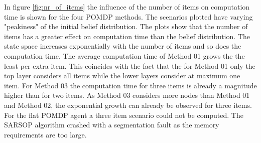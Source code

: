 In figure \ref{fig:nr_of_items} the influence of the number of items on computation time is shown for the four POMDP methods. The scenarios plotted have varying "peakiness" of the initial belief distribution. The plots show that the number of items has a greater effect on computation time than the belief distribution. The state space increases exponentially with the number of items and so does the computation time. The average computation time of Method 01 grows the the least per extra item. This coincides with the fact that the for Method 01 only the top layer considers all items while the lower layers consider at maximum one item. For Method 03 the computation time for three items is already a magnitude higher than for two items. As Method 03 considers more nodes than Method 01 and Method 02, the exponential growth can already be observed for three items. For the flat POMDP agent a three item scenario could not be computed. The SARSOP algorithm crashed with a segmentation fault as the memory requirements are too large.

